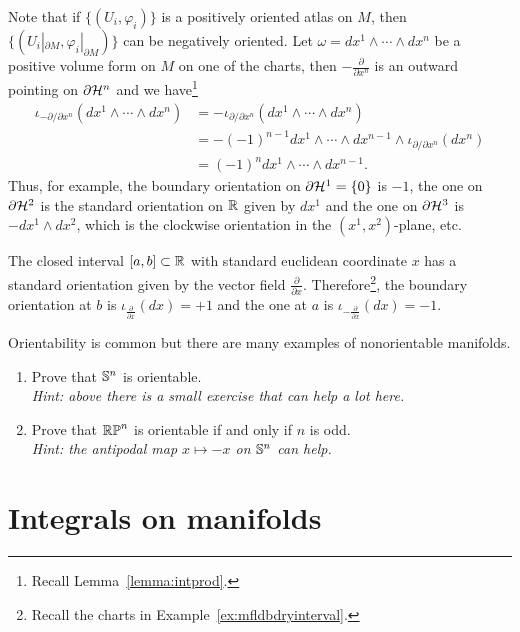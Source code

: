 Note that if $\{(U_i, \varphi_i)\}$ is a positively oriented atlas on $M$, then $\{(U_i|_{\partial M}, \varphi_i|_{\partial M})\}$ can be negatively oriented.
Let $\omega = dx^1\wedge\cdots\wedge dx^n$ be a positive volume form on $M$ on one of the charts, then $-\frac{\partial}{\partial x^n}$ is an outward pointing on $\partial \mathcal{H}^n$ and we have\footnote{Recall Lemma~\ref{lemma:intprod}.}
\begin{align}
  \iota_{-{\partial}/\!{\partial x^n}} (dx^1\wedge\cdots\wedge dx^n)
   & = -\iota_{{\partial}/\!{\partial x^n}} (dx^1\wedge\cdots\wedge dx^n)                           \\
   & = -(-1)^{n-1} dx^1\wedge\cdots\wedge dx^{n-1}\wedge \iota_{{\partial}/\!{\partial x^n}} (dx^n) \\
   & = (-1)^n dx^1\wedge\cdots\wedge dx^{n-1}.
\end{align}
Thus, for example, the boundary orientation on $\partial \mathcal{H}^1 = \{0\}$ is $-1$, the one on $\partial \mathcal{H}^2$ is the standard orientation on $\mathbb{R}$ given by $dx^1$ and the one on $\partial \mathcal{H}^3$ is $-dx^1\wedge dx^2$, which is the clockwise orientation in the $(x^1, x^2)$-plane, etc.

\begin{example}\label{ex:int:bdryo}
  The closed interval $[a,b]\subset\mathbb{R}$ with standard euclidean coordinate $x$ has a standard orientation given by the vector field $\frac{\partial}{\partial x}$.
  Therefore\footnote{Recall the charts in Example~\ref{ex:mfldbdryinterval}.}, the boundary orientation at $b$ is $\iota_{\frac{\partial}{\partial x}}(dx) = +1$ and the one at $a$ is $\iota_{-\frac{\partial}{\partial x}}(dx) = -1$.
\end{example}

\begin{exercise}
  Orientability is common but there are many examples of nonorientable manifolds.
  \begin{enumerate}
    \item Prove that $\mathbb{S}^n$ is orientable.\\
          \textit{\small Hint: above there is a small exercise that can help a lot here.}
    \item Prove that $\mathbb{RP}^n$ is orientable if and only if $n$ is odd. \\
          \textit{\small Hint: the antipodal map $x\mapsto -x$ on $\mathbb{S}^n$ can help.}
  \end{enumerate}
\end{exercise}

\section{Integrals on manifolds}

